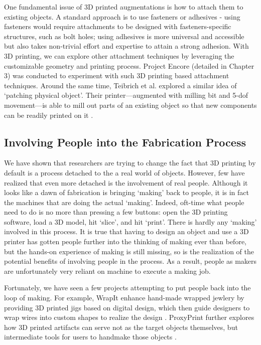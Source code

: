 One fundamental issue of 3D printed augmentations is how to attach them to existing objects. A standard approach is to use fasteners or adhesives - using fasteners would require attachments to be designed with fasteners-specific structures, such as bolt holes; using adhesives is more universal and accessible but also takes non-trivial effort and expertise to attain a strong adhesion. With 3D printing, we can explore other attachment techniques by leveraging the customizable geometry and printing process. Project Encore (detailed in Chapter 3) was conducted to experiment with such 3D printing based attachment techniques. Around the same time, Teibrich et al. explored a similar idea of `patching physical object'. Their printer---augmented with milling bit and 5-dof movement---is able to mill out parts of an existing object so that new components can be readily printed on it \cite{teibrich2015patching}.

\subsection{Involving People into the Fabrication Process}
We have shown that researchers are trying to change the fact that 3D printing by default is a process detached to the a real world of objects. However, few have realized that even more detached is the involvement of real people. Although it looks like a dawn of fabrication is bringing `making' back to people, it is in fact  the machines that are doing the actual `making'. Indeed, oft-time what people need to do is no more than pressing a few buttons: open the 3D printing software, load a 3D model, hit `slice', and hit `print'. There is hardly any `making' involved in this process. It is true that having to design an object and use a 3D printer has gotten people further into the thinking of making ever than before, but the hands-on experience of making is still missing, so is the realization of the potential benefits of involving people in the process. As a result, people as makers are unfortunately very reliant on machine to execute a making job.

Fortunately, we have seen a few projects attempting to put people back into the loop of making. For example,  WrapIt enhance hand-made wrapped jewlery by providing 3D printed jigs based on digital design, which then guide designers to wrap wires into custom shapes to realize the design \cite{iarussi2015wrapit}. ProxyPrint further explores how 3D printed artifacts can serve not as the target objects themselves, but intermediate tools for users to handmake those objects \cite{torres2016proxyprint}. 

